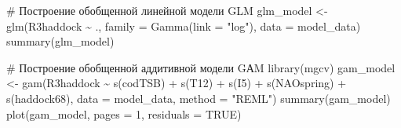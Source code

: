 \documentclass[
  letterpaper,
  DIV=11,
  numbers=noendperiod]{scrreprt}
\newenvironment{Shaded}{\begin{snugshade}}{\end{snugshade}}
\newcommand{\AttributeTok}[1]{\textcolor[rgb]{0.40,0.45,0.13}{#1}}
\newcommand{\CommentTok}[1]{\textcolor[rgb]{0.37,0.37,0.37}{#1}}
\newcommand{\ConstantTok}[1]{\textcolor[rgb]{0.56,0.35,0.01}{#1}}
\newcommand{\DecValTok}[1]{\textcolor[rgb]{0.68,0.00,0.00}{#1}}
\newcommand{\FunctionTok}[1]{\textcolor[rgb]{0.28,0.35,0.67}{#1}}
\newcommand{\NormalTok}[1]{\textcolor[rgb]{0.00,0.23,0.31}{#1}}
\newcommand{\OtherTok}[1]{\textcolor[rgb]{0.00,0.23,0.31}{#1}}
\newcommand{\SpecialCharTok}[1]{\textcolor[rgb]{0.37,0.37,0.37}{#1}}
\newcommand{\StringTok}[1]{\textcolor[rgb]{0.13,0.47,0.30}{#1}}
\begin{document}
\begin{Shaded}
\begin{Highlighting}[]
\CommentTok{\# Построение обобщенной линейной модели GLM}
\NormalTok{glm\_model }\OtherTok{\textless{}{-}} \FunctionTok{glm}\NormalTok{(R3haddock }\SpecialCharTok{\textasciitilde{}}\NormalTok{ ., }
                \AttributeTok{family =} \FunctionTok{Gamma}\NormalTok{(}\AttributeTok{link =} \StringTok{"log"}\NormalTok{), }
                \AttributeTok{data =}\NormalTok{ model\_data)}
\FunctionTok{summary}\NormalTok{(glm\_model)}

\CommentTok{\# Построение обобщенной аддитивной модели GАM}
\FunctionTok{library}\NormalTok{(mgcv)}
\NormalTok{gam\_model }\OtherTok{\textless{}{-}} \FunctionTok{gam}\NormalTok{(R3haddock }\SpecialCharTok{\textasciitilde{}} 
                 \FunctionTok{s}\NormalTok{(codTSB) }\SpecialCharTok{+} 
                 \FunctionTok{s}\NormalTok{(T12) }\SpecialCharTok{+} 
                 \FunctionTok{s}\NormalTok{(I5) }\SpecialCharTok{+} 
                 \FunctionTok{s}\NormalTok{(NAOspring) }\SpecialCharTok{+} 
                 \FunctionTok{s}\NormalTok{(haddock68),}
               \AttributeTok{data =}\NormalTok{ model\_data,}
               \AttributeTok{method =} \StringTok{"REML"}\NormalTok{)}
\FunctionTok{summary}\NormalTok{(gam\_model)}
\FunctionTok{plot}\NormalTok{(gam\_model, }\AttributeTok{pages =} \DecValTok{1}\NormalTok{, }\AttributeTok{residuals =} \ConstantTok{TRUE}\NormalTok{)}




\end{Highlighting}
\end{Shaded}
\end{document}
